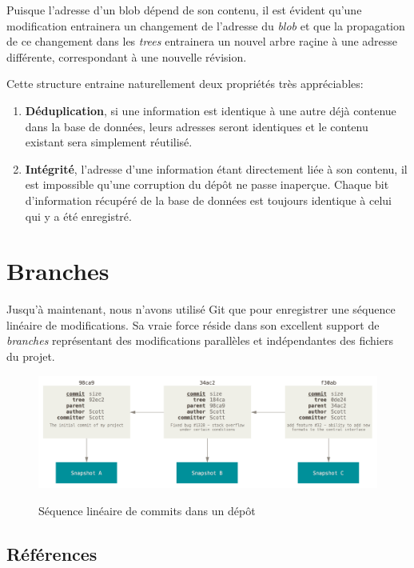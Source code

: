 \documentclass[11pt,a4paper]{article}
\begin{document}
Puisque l'adresse d'un blob dépend de son contenu, il est évident qu'une modification entrainera un changement de l'adresse du \textit{blob} et que la propagation de ce changement dans les \textit{trees} entrainera un nouvel arbre raçine à une adresse différente, correspondant à une nouvelle révision.

Cette structure entraine naturellement deux propriétés très appréciables:

\begin{enumerate}
	\item \textbf{Déduplication}, 
	si une information est identique à une autre déjà contenue dans la base de données, leurs adresses seront identiques et le contenu existant sera simplement réutilisé.
	
	\item \textbf{Intégrité},
	l'adresse d'une information étant directement liée à son contenu, il est impossible qu'une corruption du dépôt ne passe inaperçue.
	Chaque bit d'information récupéré de la base de données est toujours identique à celui qui y a été enregistré.
\end{enumerate}

\section{Branches}

Jusqu'à maintenant, nous n'avons utilisé Git que pour enregistrer une séquence linéaire de modifications. Sa vraie force réside dans son excellent support de \textit{branches} représentant des modifications parallèles et indépendantes des fichiers du projet.

\begin{figure}[h]
\begin{center}
\includegraphics[width=11.5cm]{img_commits_chain} \cite{progit}
\caption{Séquence linéaire de commits dans un dépôt}
\end{center}
\end{figure}

\subsection{Références}
\end{document}
